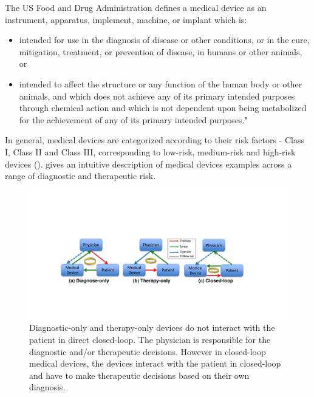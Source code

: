 The US Food and Drug Administration defines a medical device as an instrument, apparatus, implement, machine, or implant which is:
\begin{itemize}
	\item intended for use in the diagnosis of disease or other conditions, or in the cure, mitigation, treatment, or prevention of disease, in humans or other animals, or
	\item intended to affect the structure or any function of the human body or other animals, and which does not achieve any of its primary intended purposes through chemical action and which is not dependent upon being metabolized for the achievement of any of its primary intended purposes."
\end{itemize}
\newpage
In general, medical devices are categorized according to their risk factors - Class I, Class II and Class III, corresponding to low-risk, medium-risk and high-risk devices (\cite{class}).   gives an intuitive description of medical devices examples across a range of diagnostic and therapeutic risk.


\begin{figure}[t]
		\centering
		\includegraphics[width=\textwidth]{figs/closed-loop.pdf}
		\caption{\small Diagnostic-only and therapy-only devices do not interact with the patient in direct closed-loop. The physician is responsible for the diagnostic and/or therapeutic decisions. However in closed-loop medical devices, the devices interact with the patient in closed-loop and have to make therapeutic decisions based on their own diagnosis.}
		\label{fig:closed-loop}
\end{figure}
